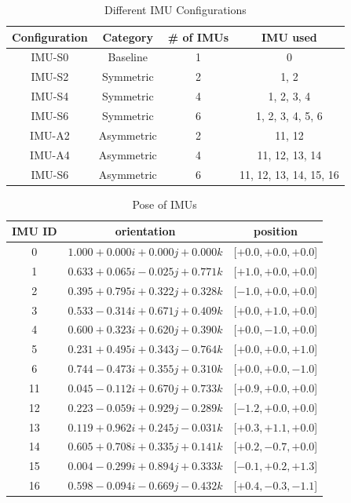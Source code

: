 \documentclass[conference]{IEEEtran}
\begin{document}
\begin{table}[h!]
\centering
\caption{Different IMU Configurations}
\label{tab:imu_config}
\begin{tabular}{cccc}
\toprule
\textbf{Configuration} & \textbf{Category} & \textbf{\# of IMUs} & \textbf{IMU used}  \\
\midrule
IMU-S0 & Baseline  & 1 & 0 \\
\midrule
IMU-S2 & Symmetric & 2 & 1, 2 \\
IMU-S4 & Symmetric & 4 & 1, 2, 3, 4 \\
IMU-S6 & Symmetric & 6 & 1, 2, 3, 4, 5, 6 \\
\midrule
IMU-A2 & Asymmetric & 2 & 11, 12 \\
IMU-A4 & Asymmetric & 4 & 11, 12, 13, 14 \\
IMU-S6 & Asymmetric & 6 & 11, 12, 13, 14, 15, 16 \\

\bottomrule
\end{tabular}
\end{table}

\begin{table}[h!]
\centering
\caption{Pose of IMUs}
\label{tab:imu_pose}
\begin{tabular}{ccc}
\toprule
\textbf{IMU ID} & \textbf{orientation} & \textbf{position} \\
\midrule
0      & $1.000 +0.000i +0.000j + 0.000k$ & [$+0.0, +0.0, +0.0$] \\
\midrule
1      & $0.633 +0.065i -0.025j +0.771k$ & [$+1.0, +0.0, +0.0$] \\
2      & $0.395 +0.795i +0.322j +0.328k$ & [$-1.0, +0.0, +0.0$] \\
3      & $0.533 -0.314i +0.671j +0.409k$ & [$+0.0, +1.0, +0.0$] \\
4      & $0.600 +0.323i +0.620j +0.390k$ & [$+0.0, -1.0, +0.0$] \\
5      & $0.231 +0.495i +0.343j -0.764k$ & [$+0.0, +0.0, +1.0$] \\
6      & $0.744 -0.473i +0.355j +0.310k$ & [$+0.0, +0.0, -1.0$] \\
\midrule
11     & $0.045 -0.112i +0.670j +0.733k$ & [$+0.9, +0.0, +0.0$] \\
12     & $0.223 -0.059i +0.929j -0.289k$ & [$-1.2, +0.0, +0.0$] \\
13     & $0.119 +0.962i +0.245j -0.031k$ & [$+0.3, +1.1, +0.0$] \\
14     & $0.605 +0.708i +0.335j +0.141k$ & [$+0.2, -0.7, +0.0$] \\
15     & $0.004 -0.299i +0.894j +0.333k$ & [$-0.1, +0.2, +1.3$] \\
16     & $0.598 -0.094i -0.669j -0.432k$ & [$+0.4, -0.3, -1.1$] \\
\bottomrule
\end{tabular}
\end{table}
\end{document}
